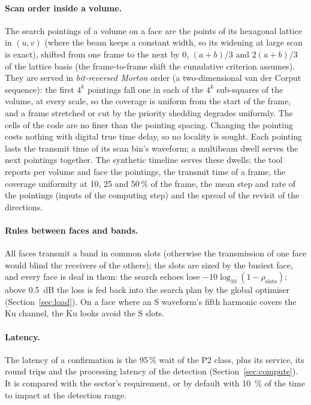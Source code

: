 \documentclass[11pt,a4paper]{article}
\begin{document}
\paragraph{Scan order inside a volume.} The search pointings of a volume on a face are the points of its hexagonal
lattice in $(u,v)$ (where the beam keeps a constant width, so its widening at large scan is exact), shifted from one
frame to the next by $0$, $(a+b)/3$ and $2(a+b)/3$ of the lattice basis (the frame-to-frame shift the cumulative
criterion assumes). They are served in \emph{bit-reversed Morton} order (a two-dimensional van der Corput sequence):
the first $4^k$ pointings fall one in each of the $4^k$ sub-squares of the volume, at every scale, so the coverage is
uniform from the start of the frame, and a frame stretched or cut by the priority shedding degrades uniformly. The
cells of the code are no finer than the pointing spacing. Changing the pointing costs nothing with digital true time
delay, so no locality is sought. Each pointing lasts the transmit time of its scan bin's waveform; a multibeam dwell
serves the next pointings together. The synthetic timeline serves these dwells; the tool reports per volume and face
the pointings, the transmit time of a frame, the coverage uniformity at 10, 25 and 50\,\% of the frame, the mean step
and rate of the pointings (inputs of the computing step) and the spread of the revisit of the directions.

\paragraph{Rules between faces and bands.} All faces transmit a band in common slots (otherwise the transmission of one
face would blind the receivers of the others); the slots are sized by the busiest face, and every face is deaf in
them: the search echoes lose $-10\log_{10}(1-\rho_{\mathrm{slots}})$; above \SI{0.5}{dB} the loss is fed back into the
search plan by the global optimiser (Section~\ref{sec:load}). On a face where an S waveform's fifth harmonic covers the Ku channel, the Ku looks avoid the S
slots.

\paragraph{Latency.} The latency of a confirmation is the 95\,\% wait of the P2 class, plus its service, its round
trips and the processing latency of the detection (Section~\ref{sec:compute}). It is compared with the sector's
requirement, or by default with \SI{10}{\percent} of the time to impact at the detection range.
\end{document}
